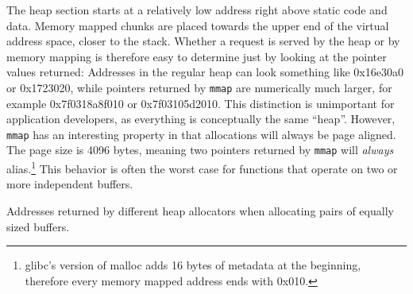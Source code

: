 \documentclass[10pt, conference, compsocconf]{IEEEtran}
\begin{document}
The heap section starts at a relatively low address right above static code and data.
Memory mapped chunks are placed towards the upper end of the virtual address space, closer to the stack.
Whether a request is served by the heap or by memory mapping is therefore easy to determine just by looking at the pointer values returned:
Addresses in the regular heap can look something like 0x16e30a0 or 0x1723020, while pointers returned by \texttt{mmap} are numerically much larger, for example 0x7f0318a8f010 or 0x7f03105d2010.
This distinction is unimportant for application developers, as everything is conceptually the same ``heap''.
However, \texttt{mmap} has an interesting property in that allocations will always be page aligned.
The page size is 4096 bytes, meaning two pointers returned by \texttt{mmap} will \emph{always} alias.\footnote{glibc's version of malloc adds 16 bytes of metadata at the beginning, therefore every memory mapped address ends with 0x010.}
This behavior is often the worst case for functions that operate on two or more independent buffers.

\begin{table}[t]
  \centering
  \caption{Addresses returned by different heap allocators when allocating pairs of equally sized buffers.\label{tab:mallocompare}}
\end{table}
\end{document}
